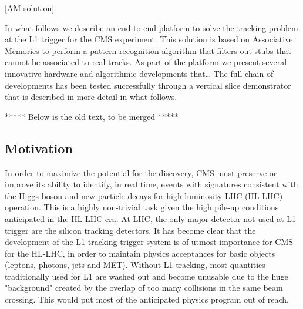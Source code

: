 [AM solution]

In what follows we describe an end-to-end platform to solve the tracking problem at the L1 trigger for the CMS experiment. This solution is based on Associative Memories to perform a pattern recognition algorithm that filters out stubs that cannot be associated to real tracks. As part of the platform we present several innovative hardware and algorithmic developments that… The full chain of developments has been tested successfully through a vertical slice demonstrator that is described in more detail in what follows.



***** Below is the old text, to be merged *****

\subsection{Motivation}


In order to maximize the potential for the discovery, CMS must preserve or improve its ability to identify, in real time, events with signatures consistent with the Higgs boson and new particle decays for high luminosity LHC (HL-LHC) operation. This is a highly non-trivial task given the high pile-up conditions anticipated in the HL-LHC era. At LHC, the only major detector not used at L1 trigger are the silicon tracking detectors. It has become clear that the development of the L1 tracking trigger system is of utmost importance for CMS for the HL-LHC, in order to maintain physics acceptances for basic objects (leptons, photons, jets and MET).  Without L1 tracking, most quantities traditionally used for L1 are washed out and become unusable due to the huge "background" created by the overlap of too many collisions in the same beam crossing. This would put most of the anticipated physics program out of reach. 

